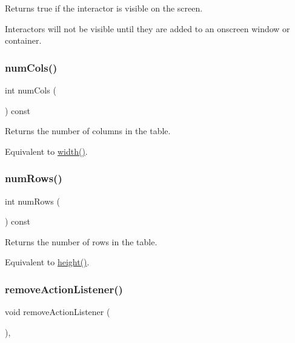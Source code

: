 Returns true if the interactor is visible on the screen. 

Interactors will not be visible until they are added to an onscreen window or container. \mbox{\label{classsgl_1_1GTable_a5997e103e56aae1db12e1f7f02e136c5}} 
\subsubsection{\texorpdfstring{num\+Cols()}{numCols()}}
{\footnotesize\ttfamily int num\+Cols (\begin{DoxyParamCaption}{ }\end{DoxyParamCaption}) const\hspace{0.3cm}{\ttfamily [virtual]}}



Returns the number of columns in the table. 

Equivalent to \mbox{\hyperlink{classsgl_1_1GTable_ad72663daf610f2a0833a2fc3d78e4fdf}{width()}}. \mbox{\label{classsgl_1_1GTable_a00b7e69dd5c43e42cc91db26c459ad8b}} 
\subsubsection{\texorpdfstring{num\+Rows()}{numRows()}}
{\footnotesize\ttfamily int num\+Rows (\begin{DoxyParamCaption}{ }\end{DoxyParamCaption}) const\hspace{0.3cm}{\ttfamily [virtual]}}



Returns the number of rows in the table. 

Equivalent to \mbox{\hyperlink{classsgl_1_1GTable_ad3774f6419003470f54fd495124ef51f}{height()}}. \mbox{\label{classsgl_1_1GInteractor_ab7fe7a876367b87cf7202f947f1d05e4}} 
\subsubsection{\texorpdfstring{remove\+Action\+Listener()}{removeActionListener()}}
{\footnotesize\ttfamily void remove\+Action\+Listener (\begin{DoxyParamCaption}{ }\end{DoxyParamCaption})\hspace{0.3cm}{\ttfamily [virtual]}, {\ttfamily [inherited]}}



